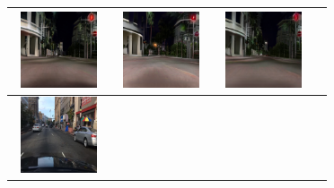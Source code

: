 \documentclass{VUMIFPSbakalaurinis}
\begin{document}
\begin{table}[H]
{\begin{tabular}{|c|c|c|c|}
            \includegraphics[width=100,height=85]{img/pvz/5_cycle_v2} & \includegraphics[width=100,height=85]{img/pvz/5_cut_v2} & \includegraphics[width=100,height=85]{img/pvz/5_mspc_v2}
            \\
            \hline
            \includegraphics[width=100,height=85]{img/pvz/6_real} & 

\end{tabular}}
\end{table}
\end{document}
